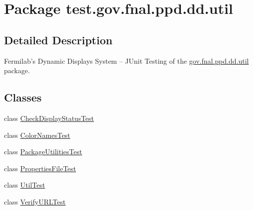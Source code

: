 \hypertarget{namespacetest_1_1gov_1_1fnal_1_1ppd_1_1dd_1_1util}{\section{Package test.\-gov.\-fnal.\-ppd.\-dd.\-util}
\label{namespacetest_1_1gov_1_1fnal_1_1ppd_1_1dd_1_1util}
}


\subsection{Detailed Description}
Fermilab's Dynamic Displays System -- J\-Unit Testing of the \hyperlink{namespacetest_1_1gov_1_1fnal_1_1ppd_1_1dd_1_1util}{gov.\-fnal.\-ppd.\-dd.\-util} package.\subsection*{Classes}
\begin{DoxyCompactItemize}
\item 
class \hyperlink{classtest_1_1gov_1_1fnal_1_1ppd_1_1dd_1_1util_1_1CheckDisplayStatusTest}{Check\-Display\-Status\-Test}
\item 
class \hyperlink{classtest_1_1gov_1_1fnal_1_1ppd_1_1dd_1_1util_1_1ColorNamesTest}{Color\-Names\-Test}
\item 
class \hyperlink{classtest_1_1gov_1_1fnal_1_1ppd_1_1dd_1_1util_1_1PackageUtilitiesTest}{Package\-Utilities\-Test}
\item 
class \hyperlink{classtest_1_1gov_1_1fnal_1_1ppd_1_1dd_1_1util_1_1PropertiesFileTest}{Properties\-File\-Test}
\item 
class \hyperlink{classtest_1_1gov_1_1fnal_1_1ppd_1_1dd_1_1util_1_1UtilTest}{Util\-Test}
\item 
class \hyperlink{classtest_1_1gov_1_1fnal_1_1ppd_1_1dd_1_1util_1_1VerifyURLTest}{Verify\-U\-R\-L\-Test}
\end{DoxyCompactItemize}

